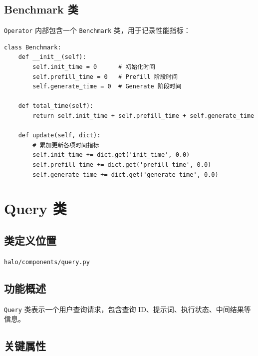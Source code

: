 \documentclass[12pt,a4paper]{article}
\begin{document}
\subsection{Benchmark 类}

\texttt{Operator} 内部包含一个 \texttt{Benchmark} 类，用于记录性能指标：

\begin{lstlisting}
class Benchmark:
    def __init__(self):
        self.init_time = 0      # 初始化时间
        self.prefill_time = 0   # Prefill 阶段时间
        self.generate_time = 0  # Generate 阶段时间
    
    def total_time(self):
        return self.init_time + self.prefill_time + self.generate_time
    
    def update(self, dict):
        # 累加更新各项时间指标
        self.init_time += dict.get('init_time', 0.0)
        self.prefill_time += dict.get('prefill_time', 0.0)
        self.generate_time += dict.get('generate_time', 0.0)
\end{lstlisting}

\section{Query 类}

\subsection{类定义位置}
\texttt{halo/components/query.py}

\subsection{功能概述}
\texttt{Query} 类表示一个用户查询请求，包含查询 ID、提示词、执行状态、中间结果等信息。

\subsection{关键属性}
\end{document}
